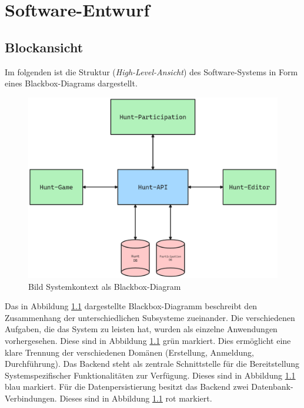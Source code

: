 \chapter{Software-Entwurf} \label{cha:swentwurf}

\section{Blockansicht}

Im folgenden ist die Struktur (\textit{High-Level-Ansicht}) des Software-Systems in Form eines Blackbox-Diagrams dargestellt.

\begin{figure}[H]
    \centering
    \includegraphics[width=\textwidth]{images/PrAr-Software-Entwurf-Blockansicht.png}
    \caption{Bild Systemkontext als Blackbox-Diagram}
    \label{fig:swentwurf:blackbox}
\end{figure}

Das in Abbildung \ref{fig:swentwurf:blackbox} dargestellte Blackbox-Diagramm beschreibt den Zusammenhang der unterschiedlichen Subsysteme zueinander. Die verschiedenen Aufgaben, die das System zu leisten hat, wurden als einzelne Anwendungen vorhergesehen. Diese sind in Abbildung \ref{fig:swentwurf:blackbox} grün markiert. Dies ermöglicht eine klare Trennung der verschiedenen Domänen (Erstellung, Anmeldung, Durchführung). Das Backend steht als zentrale Schnittstelle für die Bereitstellung Systemspezifischer Funktionalitäten zur Verfügung. Dieses sind in Abbildung \ref{fig:swentwurf:blackbox} blau markiert. Für die Datenpersistierung besitzt das Backend zwei Datenbank-Verbindungen. Dieses sind in Abbildung \ref{fig:swentwurf:blackbox} rot markiert.

